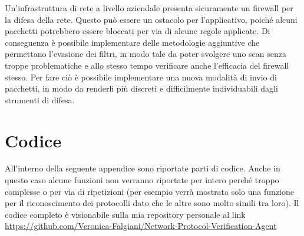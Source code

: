 \documentclass[12pt]{report}
\begin{document}
Un'infrastruttura di rete a livello aziendale presenta sicuramente un firewall per la difesa della rete. Questo può essere un ostacolo per l'applicativo, poiché alcuni pacchetti potrebbero essere bloccati per via di alcune regole applicate. Di conseguenza è possibile implementare delle metodologie aggiuntive che permettano l'evasione dei filtri, in modo tale da poter svolgere uno scan senza troppe problematiche e allo stesso tempo verificare anche l'efficacia del firewall stesso. Per fare ciò è possibile implementare una nuova modalità di invio di pacchetti, in modo da renderli più discreti e difficilmente individuabili dagli strumenti di difesa.

%
%

\beforebibliography



% 
% 
\appendix
\chapter{Codice}

All'interno della seguente appendice sono riportate parti di codice. Anche in questo caso alcune funzioni non verranno riportate per intero perché troppo complesse o per via di ripetizioni (per esempio verrà mostrata solo una funzione per il riconoscimento dei protocolli dato che le altre sono molto simili tra loro).
Il codice completo è visionabile sulla mia repository personale al link \url{ https://github.com/Veronica-Falgiani/Network-Protocol-Verification-Agent}
\end{document}
